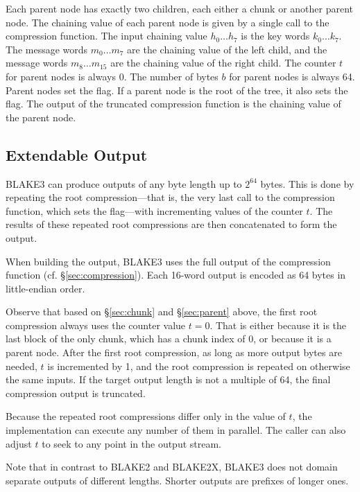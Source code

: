 \documentclass[11pt,notitlepage,a4paper]{article}
\newcommand{\flag}[1]{\texttt{\detokenize{#1}}\xspace}
\begin{document}
Each parent node has exactly two children, each either a chunk or another
parent node. The chaining value of each parent node is given by a single call
to the compression function. The input chaining value $h_{0} \ldots h_{7}$ is
the key words $k_{0} \ldots k_{7}$. The message words $m_{0} \ldots m_{7}$ are
the chaining value of the left child, and the message words $m_{8} \ldots
m_{15}$ are the chaining value of the right child. The counter $t$ for parent
nodes is always 0. The number of bytes $b$ for parent nodes is always 64.
Parent nodes set the \flag{PARENT} flag. If a parent node is the root of the
tree, it also sets the \flag{ROOT} flag. The output of the truncated
compression function is the chaining value of the parent node.

\subsection{Extendable Output}\label{sec:extendable}

BLAKE3 can produce outputs of any byte length up to $2^{64}$ bytes. 
This is done by repeating the root compression---that is, the very last 
call to the compression function, which sets the \flag{ROOT} flag---with 
incrementing values of the counter $t$. The results of these repeated root 
compressions are then concatenated to form the output.

When building the output, BLAKE3 uses the full output of the
compression function (cf. \S\ref{sec:compression}). Each 16-word output is
encoded as 64 bytes in little-endian order.

Observe that based on \S\ref{sec:chunk} and \S\ref{sec:parent} above, the first
root compression always uses the counter value $t = 0$. That is either because
it is the last block of the only chunk, which has a chunk index of $0$, or
because it is a parent node. After the first root compression, as long as more
output bytes are needed, $t$ is incremented by 1, and the root compression is
repeated on otherwise the same inputs. If the target output length is not a
multiple of 64, the final compression output is truncated.

Because the repeated root compressions differ only in the value of $t$, the
implementation can execute any number of them in parallel. The caller can also
adjust $t$ to seek to any point in the output stream.

Note that in contrast to BLAKE2 and BLAKE2X, BLAKE3 does not domain separate
outputs of different lengths. Shorter outputs are prefixes of longer ones.
\end{document}
